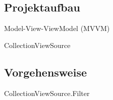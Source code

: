 \subsection {Projektaufbau}

Model-View-ViewModel (MVVM) 
\cite{.g}

CollectionViewSource
\cite{dotnetbot.}

\subsection {Vorgehensweise}

CollectionViewSource.Filter
\cite{dotnetbot.b}










